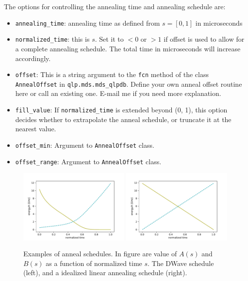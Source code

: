\documentclass[]{article}
\begin{document}
The options for controlling the annealing time and annealing schedule are:
\begin{itemize}
	\item \texttt{annealing\_time}: annealing time as defined from $s=[0, 1]$ in microseconds
	\item \texttt{normalized\_time}: this is $s$. Set it to $<0$ or $>1$ if offset is used to allow for a complete annealing schedule. The total time in microseconds will increase accordingly.
	\item \texttt{offset}: This is a string argument to the \texttt{fcn} method of the class \texttt{AnnealOffset} in \texttt{qlp.mds.mds\_qlpdb}. Define your own anneal offset routine here or call an existing one. E-mail me if you need more explanation.
	\item \texttt{fill\_value}: If \texttt{normalized\_time} is extended beyond (0, 1), this option decides whether to extrapolate the anneal schedule, or truncate it at the nearest value.
	\item \texttt{offset\_min}: Argument to \texttt{AnnealOffset} class.
	\item \texttt{offset\_range}: Argument to \texttt{AnnealOffset} class.
\end{itemize}

\begin{figure}[htb]
	\centering
	\includegraphics[width=0.49\textwidth]{coefficient_dwave.pdf}
	\includegraphics[width=0.49\textwidth]{coefficient_linear.pdf}
	\caption{\label{fig:anneal_schedules} Examples of anneal schedules. In figure are value of $A(s)$ and $B(s)$ as a function of normalized time $s$. The DWave schedule (left), and a idealized linear annealing schedule (right).
	}
\end{figure}
\end{document}
